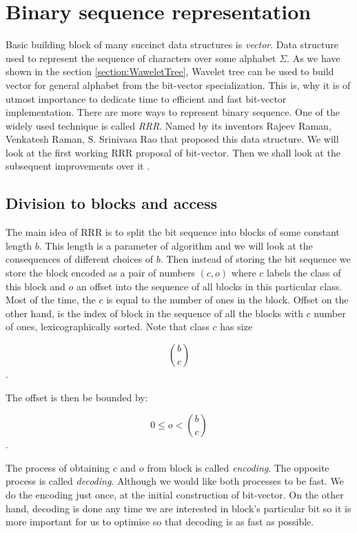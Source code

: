 \chapter{Binary sequence representation}
\label{kap:kap2}

Basic building block of many succinct data structures is \textit{vector}. Data structure
used to represent the sequence of characters over some alphabet $\Sigma$. As we
have shown in the section \ref{section:WaweletTree}, Wavelet tree can be used to
build vector for general alphabet from the bit-vector specialization. This is, why
it is of utmost importance to dedicate time to efficient and fast bit-vector
implementation. There are more ways to represent binary sequence. One of the widely
used technique is called \textit{RRR}. Named by its inventors Rajeev Raman, Venkatesh Raman,
S. Srinivasa Rao that proposed this data structure\cite{raman2007succinct}. We will look
at the first working RRR proposal of bit-vector\cite{claude2008practical}. Then we
shall look at the subsequent improvements over it \cite{navarro2012fast}.

\section{Division to blocks and access}

The main idea of RRR is to split the bit sequence into blocks of some constant
length $b$. This length is a parameter of algorithm and we will look at the consequences
of different choices of $b$. Then instead of storing the bit sequence we store the
block encoded as a pair of numbers $(c, o)$ where $c$ labels the class of this
block and $o$ an offset into the sequence of all blocks in this particular class.
Most of the time, the $c$ is equal to the number of ones in the block. Offset on
the other hand, is the index of block in the sequence of all the blocks with $c$ number
of ones, lexicographically sorted. Note that class $c$ has size

                    $${b\choose c}$$.

The offset is then be bounded by:

					$$0 \leq o < {b\choose c}$$.

The process of obtaining $c$ and $o$ from block is called \textit{encoding}.
The opposite process is called \textit{decoding}. Although we would like both
processes to be fast. We do the encoding just once, at the initial construction
of bit-vector. On the other hand, decoding is done any time we are interested in
block's particular bit so it is more important for us to optimise so that decoding
is as fast as possible.

